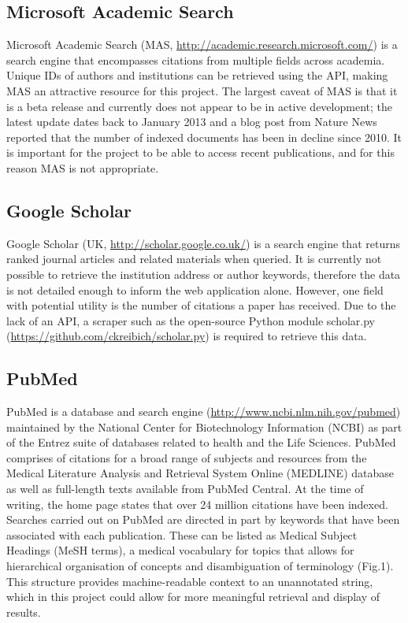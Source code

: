 \documentclass[PROP_AGutteridge_CS.tex]{subfiles}
\begin{document}
\noindent \subsection{Microsoft Academic Search}
Microsoft Academic Search (MAS, \url{http://academic.research.microsoft.com/}) is a search engine that encompasses citations from multiple fields across academia. Unique IDs of authors and institutions can be retrieved using the API, making MAS an attractive resource for this project. The largest caveat of MAS is that it is a beta release and currently does not appear to be in active development; the latest update dates back to January 2013\cite{microsoft-help} and a blog post from Nature News reported that the number of indexed documents has been in decline since 2010\cite{nature-news}. It is important for the project to be able to access recent publications, and for this reason MAS is not appropriate.

\noindent \subsection{Google Scholar}
Google Scholar (UK, \url{http://scholar.google.co.uk/}) is a search engine that returns ranked journal articles and related materials when queried. It is currently not possible to retrieve the institution address or author keywords, therefore the data is not detailed enough to inform the web application alone. However, one field with potential utility is the number of citations a paper has received. Due to the lack of an API, a scraper such as the open-source Python module scholar.py (\url{https://github.com/ckreibich/scholar.py}) is required to retrieve this data.

\noindent \subsection{PubMed}
PubMed is a database and search engine (\url{http://www.ncbi.nlm.nih.gov/pubmed}) maintained by the National Center for Biotechnology Information (NCBI) as part of the Entrez suite of databases related to health and the Life Sciences. PubMed comprises of citations for a broad range of subjects and resources from the Medical Literature Analysis and Retrieval System Online (MEDLINE) database as well as full-length texts available from PubMed Central. At the time of writing, the home page states that over 24 million citations have been indexed. \\

\noindent Searches carried out on PubMed are directed in part by keywords that have been associated with each publication. These can be listed as Medical Subject Headings (MeSH terms), a medical vocabulary for topics that allows for hierarchical organisation of concepts and disambiguation of terminology\cite{mesh} (Fig.1). This structure provides machine-readable context to an unannotated string, which in this project could allow for more meaningful retrieval and display of results. \\
\end{document}
